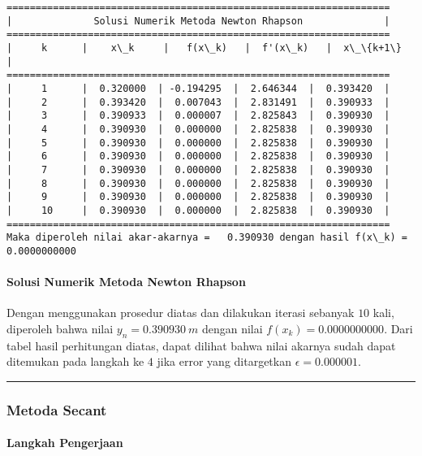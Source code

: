 \documentclass[11pt]{article}
\begin{document}
    \begin{Verbatim}[commandchars=\\\{\}]
==================================================================
|              Solusi Numerik Metoda Newton Rhapson              |
==================================================================
|     k      |    x\_k     |   f(x\_k)   |  f'(x\_k)   |  x\_\{k+1\}   |
==================================================================
|     1      |  0.320000  | -0.194295  |  2.646344  |  0.393420  | 
|     2      |  0.393420  |  0.007043  |  2.831491  |  0.390933  | 
|     3      |  0.390933  |  0.000007  |  2.825843  |  0.390930  | 
|     4      |  0.390930  |  0.000000  |  2.825838  |  0.390930  | 
|     5      |  0.390930  |  0.000000  |  2.825838  |  0.390930  | 
|     6      |  0.390930  |  0.000000  |  2.825838  |  0.390930  | 
|     7      |  0.390930  |  0.000000  |  2.825838  |  0.390930  | 
|     8      |  0.390930  |  0.000000  |  2.825838  |  0.390930  | 
|     9      |  0.390930  |  0.000000  |  2.825838  |  0.390930  | 
|     10     |  0.390930  |  0.000000  |  2.825838  |  0.390930  | 
==================================================================
Maka diperoleh nilai akar-akarnya =   0.390930 dengan hasil f(x\_k) =    0.0000000000

    \end{Verbatim}

    \paragraph{Solusi Numerik Metoda Newton
Rhapson}\label{solusi-numerik-metoda-newton-rhapson}

Dengan menggunakan prosedur diatas dan dilakukan iterasi sebanyak \(10\)
kali, diperoleh bahwa nilai \(y_n = 0.390930\ m\) dengan nilai
\(f(x_k) = 0.0000000000\). Dari tabel hasil perhitungan diatas, dapat
dilihat bahwa nilai akarnya sudah dapat ditemukan pada langkah ke \(4\)
jika error yang ditargetkan \(\epsilon = 0.000001\).

    \begin{center}\rule{0.5\linewidth}{\linethickness}\end{center}

\subsubsection{Metoda Secant}\label{metoda-secant}

\paragraph{Langkah Pengerjaan}\label{langkah-pengerjaan}
\end{document}
